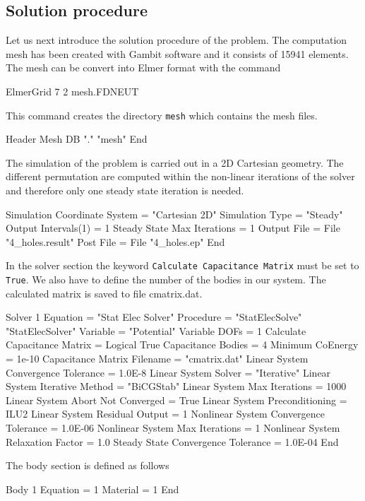 \subsection*{Solution procedure}

\begin{flushleft}
Let us next introduce the solution procedure of the problem.
The computation mesh has been created with Gambit software and it consists of 15941 elements. The mesh can be convert into Elmer format with the command

\ttbegin
ElmerGrid 7 2 mesh.FDNEUT
\ttend

This command creates the directory {\tt mesh} which contains the mesh files. 

\ttbegin
Header
  Mesh DB "." "mesh"
End
\ttend

The simulation of the problem is carried out in a 2D Cartesian geometry.
The different permutation are computed within the non-linear iterations of the solver and therefore only one
steady state iteration is needed.

\ttbegin
Simulation
  Coordinate System = "Cartesian 2D"
  Simulation Type = "Steady"
  Output Intervals(1) = 1 
  Steady State Max Iterations = 1
  Output File = File "4_holes.result"
  Post File =   File "4_holes.ep"
End
\ttend

In the solver section the keyword {\tt Calculate Capacitance Matrix} must be set to {\tt True}. 
We also have to define the number of the bodies in our system. 
The calculated matrix is saved to file cmatrix.dat.

\ttbegin
Solver 1
  Equation = "Stat Elec Solver"
  Procedure = "StatElecSolve" "StatElecSolver"
  Variable = "Potential"
  Variable DOFs = 1
  Calculate Capacitance Matrix = Logical True
  Capacitance Bodies = 4
  Minimum CoEnergy = 1e-10
  Capacitance Matrix Filename = "cmatrix.dat"
  Linear System Convergence Tolerance = 1.0E-8
  Linear System Solver = "Iterative"
  Linear System Iterative Method = "BiCGStab"
  Linear System Max Iterations = 1000
  Linear System Abort Not Converged = True
  Linear System Preconditioning = ILU2
  Linear System Residual Output = 1
  Nonlinear System Convergence Tolerance =  1.0E-06
  Nonlinear System Max Iterations = 1
  Nonlinear System Relaxation Factor = 1.0
  Steady State Convergence Tolerance =  1.0E-04
End
\ttend

The body section is defined as follows

\ttbegin
Body 1
  Equation = 1
  Material = 1
End
\ttend                                      


\end{flushleft}
